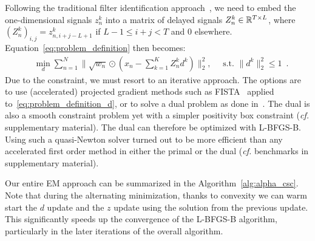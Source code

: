 Following the traditional filter identification approach~\citep{moulines1995subspace}, we need to embed the one-dimensional signals $z_n^k$ into a matrix of delayed signals $Z_n^{k} \in \mathbb{R}^{T \times L}$, where $ (Z_n^{k})_{i,j} = z_{n,i + j - L + 1}^k$ if $ L - 1 \le i+j < T$ and $0$ elsewhere. Equation~\eqref{eq:problem_definition} then becomes:
%
\begin{align}
& \min_{d} \sum_{n=1}^{N} \|\sqrt{w_n} \odot (x_{n} - \sum_{k=1}^{K}Z_{n}^{k}d^{k})\|_{2}^{2}, \quad \text{  s.t.  } \|d^k\|_2^2 \leq 1 \enspace.
\label{eq:problem_definition_d}
\end{align}
%
Due to the constraint, we must resort to an iterative approach. The options are to use (accelerated) projected gradient methods such as FISTA~\citep{beck2009fast} applied to~\eqref{eq:problem_definition_d}, or to solve a dual problem as done in~\cite{Grosse-etal:2007}. The dual is also a smooth constraint problem yet with a simpler positivity box constraint (\textit{cf.} supplementary material). The dual can therefore be optimized with L-BFGS-B. Using such a quasi-Newton solver turned out to be more efficient than any accelerated first order method in either the primal or the dual (\textit{cf.} benchmarks in supplementary material).
%




Our entire EM approach can be summarized in the Algorithm~\ref{alg:alpha_csc}.
Note that during the alternating minimization, thanks to convexity we can warm start the $d$ update and the $z$ update using the solution from the previous update. This significantly speeds up the convergence of the L-BFGS-B algorithm, particularly in the later iterations of the overall algorithm.





